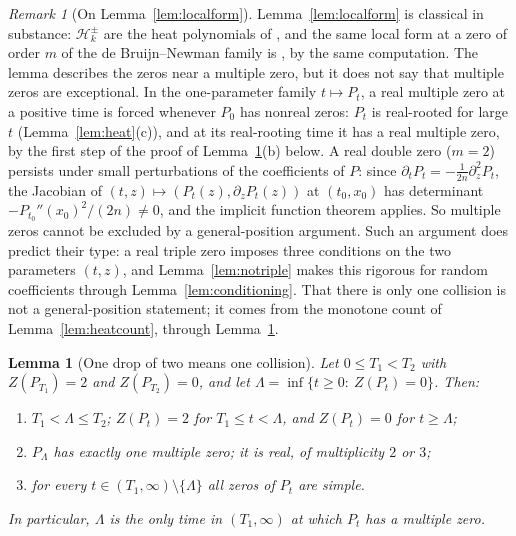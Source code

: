 \documentclass[11pt]{amsart}
\newtheorem{lemma}[theorem]{Lemma}
\theoremstyle{definition}
\theoremstyle{remark}
\newtheorem{remark}[theorem]{Remark}
\numberwithin{equation}{section}
\begin{document}
\begin{remark}[On Lemma~\ref{lem:localform}]\label{rem:localform}
Lemma~\ref{lem:localform} is classical in substance: $\mathcal H_k^\pm$ are the heat polynomials of \cite{RW}, and the same local form at a zero of order $m$ of the de Bruijn--Newman family is \cite[Proposition~3.1(ii)]{PM15}, by the same computation. The lemma describes the zeros near a multiple zero, but it does not say that multiple zeros are exceptional. In the one-parameter family $t\mapsto P_t$, a real multiple zero at a positive time is forced whenever $P_0$ has nonreal zeros: $P_t$ is real-rooted for large $t$ (Lemma~\ref{lem:heat}(c)), and at its real-rooting time it has a real multiple zero, by the first step of the proof of Lemma~\ref{lem:onedrop}(b) below. A real double zero ($m=2$) persists under small perturbations of the coefficients of $P$: since $\partial_tP_t=-\frac1{2n}\partial_z^2P_t$, the Jacobian of $(t,z)\mapsto(P_t(z),\partial_zP_t(z))$ at $(t_0,x_0)$ has determinant $-P_{t_0}''(x_0)^2/(2n)\ne0$, and the implicit function theorem applies. So multiple zeros cannot be excluded by a general-position argument. Such an argument does predict their type: a real triple zero imposes three conditions on the two parameters $(t,z)$, and Lemma~\ref{lem:notriple} makes this rigorous for random coefficients through Lemma~\ref{lem:conditioning}. That there is only one collision is not a general-position statement; it comes from the monotone count of Lemma~\ref{lem:heatcount}, through Lemma~\ref{lem:onedrop}.
\end{remark}

\begin{lemma}[One drop of two means one collision]\label{lem:onedrop}
Let $0\le T_1<T_2$ with $Z(P_{T_1})=2$ and $Z(P_{T_2})=0$, and let $\Lambda=\inf\{t\ge0:\ Z(P_t)=0\}$. Then:
\begin{enumerate}
\item[(a)] $T_1<\Lambda\le T_2$; $Z(P_t)=2$ for $T_1\le t<\Lambda$, and $Z(P_t)=0$ for $t\ge\Lambda$;
\item[(b)] $P_\Lambda$ has exactly one multiple zero; it is real, of multiplicity $2$ or $3$;
\item[(c)] for every $t\in(T_1,\infty)\setminus\{\Lambda\}$ all zeros of $P_t$ are simple.
\end{enumerate}
In particular, $\Lambda$ is the only time in $(T_1,\infty)$ at which $P_t$ has a multiple zero.
\end{lemma}
\end{document}
